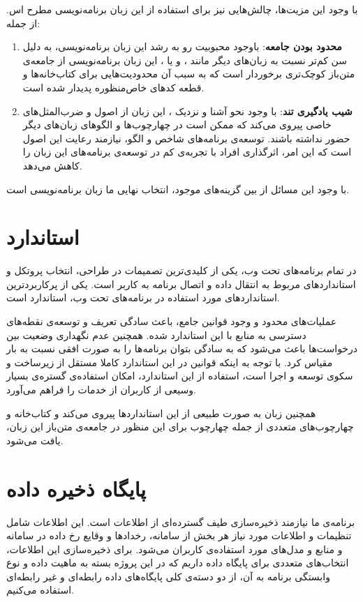 با وجود این مزیت‌ها، چالش‌هایی نیز برای استفاده از این زبان برنامه‌نویسی مطرح اس\cite{Lockard2019}. از جمله:
\begin{enumerate}
\item \textbf{محدود بودن جامعه}: باوجود محبوبیت رو به رشد این زبان برنامه‌نویسی، به دلیل سن کم‌تر نسبت به زبان‌های دیگر مانند ،  و یا ، این زبان برنامه‌نویسی از جامعه‌ی متن‌باز کوچک‌تری برخوردار است که به سبب آن محدودیت‌هایی برای کتاب‌خانه‌ها و قطعه کد‌های خاص‌منظوره پدیدار شده است.

\item \textbf{شیب یادگیری تند}: با وجود نحو آشنا و نزدیک ، این زبان از اصول و ضرب‌المثل‌های خاصی پیروی می‌کند که ممکن است در چهارچوب‌ها و الگوهای زبان‌های دیگر حضور نداشته باشند. توسعه‌ی برنامه‌های شاخص و الگو، نیازمند رعایت این اصول است که این امر، اثرگذاری افراد با تجربه‌ی کم در توسعه‌ی برنامه‌های این زبان را کاهش می‌دهد.
\end{enumerate}

با وجود این مسائل از بین گزینه‌های موجود، انتخاب نهایی ما زبان برنامه‌نویسی  است.

\section{استاندارد }
در تمام برنامه‌های تحت وب، یکی از کلیدی‌ترین تصمیمات در طراحی، انتخاب پروتکل و استاندارد‌های مربوط به انتقال داده و اتصال برنامه‌ به کاربر است. یکی از پرکاربردترین استانداردهای مورد استفاده در برنامه‌های تحت وب، استاندارد  است.

عملیات‌های محدود و وجود قوانین جامع، باعث سادگی تعریف و توسعه‌ی نقطه‌های دسترسی به منابع با این استاندارد شده. همچنین عدم نگهداری وضعیت بین درخواست‌ها باعث می‌شود که به سادگی بتوان برنامه‌ها را به صورت افقی نسبت به بار مقیاس کرد. با توجه به اینکه قوانین در این استاندارد کاملا مستقل از زیرساخت و سکوی توسعه و اجرا است، استفاده از این استاندارد، امکان استفاده‌ی گستره‌ی بسیار وسیعی از کاربران از خدمات را فراهم می‌آورد.\cite{Fielding:2000}

همچنین زبان  به صورت طبیعی از این استانداردها پیروی می‌کند و کتاب‌خانه و چهارچوب‌های متعددی از جمله چهارچوب  برای این منظور در جامعه‌ی متن‌باز این زبان، یافت می‌شود.

\section{پایگاه ذخیره داده}
برنامه‌ی ما نیازمند ذخیره‌سازی طیف گسترده‌ای از اطلاعات است. این اطلاعات شامل تنظیمات و اطلاعات مورد نیاز هر بخش از سامانه، رخداد‌ها و وقایع رخ داده در سامانه و منابع و مدل‌های مورد استفاده‌ی کاربران می‌شود. برای ذخیره‌سازی این اطلاعات، انتخاب‌های متعددی برای پایگاه داده داریم که در این پروژه بسته به ماهیت داده و نوع وابستگی برنامه به آن، از دو دسته‌ی کلی پایگاه‌های داده رابطه‌ای و غیر رابطه‌ای استفاده می‌کنیم.

